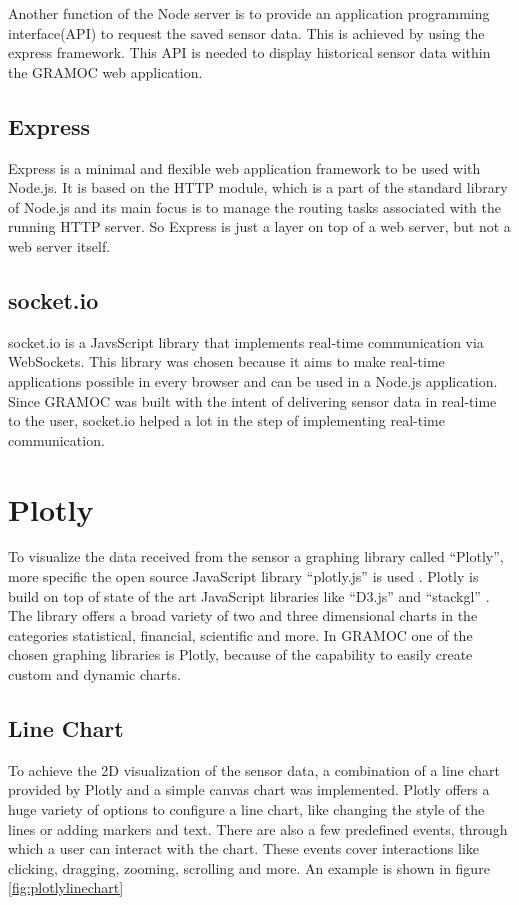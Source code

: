 Another function of the Node server is to provide an application programming interface(API) to request the saved sensor data. This is achieved by using the express framework. This API is needed to display historical sensor data within the GRAMOC web application.

\subsection{Express}
Express is a minimal and flexible web application framework to be used with Node.js. It is based on the HTTP module, which is a part of the standard library of Node.js and its main focus is to manage the routing tasks associated with the running HTTP server. So Express is just a layer on top of a web server, but not a web server itself.

\subsection{socket.io}
\label{subsec:socketio}
socket.io is a JavsScript library that implements real-time communication via WebSockets. This library was chosen because it aims to make real-time applications possible in every browser and can be used in a Node.js application. Since GRAMOC was built with the intent of delivering sensor data in real-time to the user, socket.io helped a lot in the step of implementing real-time communication.


\section{Plotly}
\label{sec:Plotly}
To visualize the data received from the sensor a graphing library called ``Plotly'', more specific the open source JavaScript library ``plotly.js'' is used \autocite{Plotly} \autocite{PlotlyJS}. Plotly is build on top of state of the art JavaScript libraries like ``D3.js''  and ``stackgl'' \autocite{d3} \autocite{stackgl}. The library offers a broad variety of two and three dimensional charts in the categories statistical, financial, scientific and more. In GRAMOC one of the chosen graphing libraries is Plotly, because of the capability to easily create custom and dynamic charts.

\subsection{Line Chart}
To achieve the 2D visualization of the sensor data, a combination of a line chart provided by Plotly and a simple canvas chart was implemented. Plotly offers a huge variety of options to configure a line chart, like changing the style of the lines or adding markers and text. There are also a few predefined events, through which a user can interact with the chart. These events cover interactions like clicking, dragging, zooming, scrolling and more. An example is shown in figure \vref{fig:plotlylinechart}


